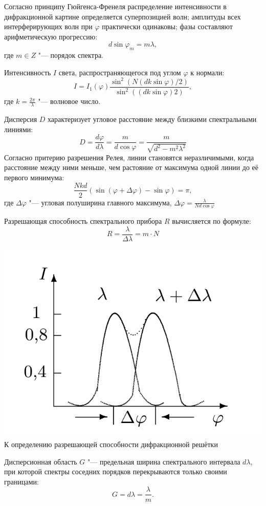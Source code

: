 Согласно принципу Гюйгенса-Френеля распределение интенсивности в дифракционной картине определяется суперпозицией волн; амплитуды всех интерферирующих волн при $\varphi$ практически одинаковы; фазы составляют арифметическую прогрессию:
\[
    d \sin \varphi_m = m \lambda,
 \]
 где $m \in Z$ "--- порядок спектра.
 
 Интенсивность $I$ света, распространяющегося под углом $\varphi$ к нормали:
 \[
 I = I_1(\varphi)\frac{\sin^2 (N(dk \sin \varphi) / 2)}{\sin^2 ((dk \sin \varphi) 2)},
 \]
 где $k = \frac{2 \pi}{\lambda}$ "--- волновое число.
 
 Дисперсия $D$ характеризует угловое расстояние между близкими спектральными линиями:
 \[
 D = \frac{d \varphi}{d \lambda} = \frac{m}{d \cos \varphi} = \frac{m}{\sqrt{d^2 - m^2 \lambda^2}}
 \]
 Согласно притерию разрешения Релея, линии становятся неразличимыми, когда расстояние между ними меньше, чем растояние от максимума одной линии до её первого минимума:
 \[
    \frac{Nkd}{2}(\sin (\varphi + \Delta \varphi) - \sin \varphi) = \pi,
 \]
 где $\Delta \varphi$ "--- угловая полуширина главного максимума, $\Delta \varphi = \frac{\lambda}{Nd \cos \varphi}$
 
 
 Разрешающая способность спектрального прибора $R$ вычисляется по формуле:
 \[
 R = \frac{\lambda}{\Delta \lambda} = m \cdot N
 \]
\begin{center}
    \includegraphics[width = 1.0\linewidth]{4.4.2/k.png}
    {К определению разрешающей способности дифракционной решётки}
\end{center}
Дисперсионная область $G$ "--- предельная ширина спектрального интервала $d \lambda$, при которой спектры соседних порядков перекрываются только своими границами:
\[
G = d \lambda = \frac{\lambda}{m}.
\]

